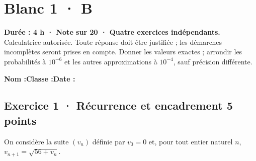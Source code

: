 \fi

\fi

\ifmxteacher

\mxnewpage{}\label{sujet:5-4}

\section*{Blanc 1 · B}


\textbf{Durée : 4 h · Note sur 20 · Quatre exercices indépendants.}\\Calculatrice autorisée. Toute réponse doit être justifiée ; les démarches incomplètes seront prises en compte. Donner les valeurs exactes ; arrondir les probabilités à $10^{-6}$ et les autres approximations à $10^{-4}$, sauf précision différente.

\smallskip\textbf{Nom :}\enspace\dotfill\quad\textbf{Classe :}\enspace\dotfill\quad\textbf{Date :}\enspace\dotfill

\subsection*{Exercice 1 · Récurrence et encadrement \hfill 5 points}On considère la suite $(v_n)$ définie par $v_0=0$ et, pour tout entier naturel $n$, $v_{n+1}=\sqrt{56+v_n}$.

